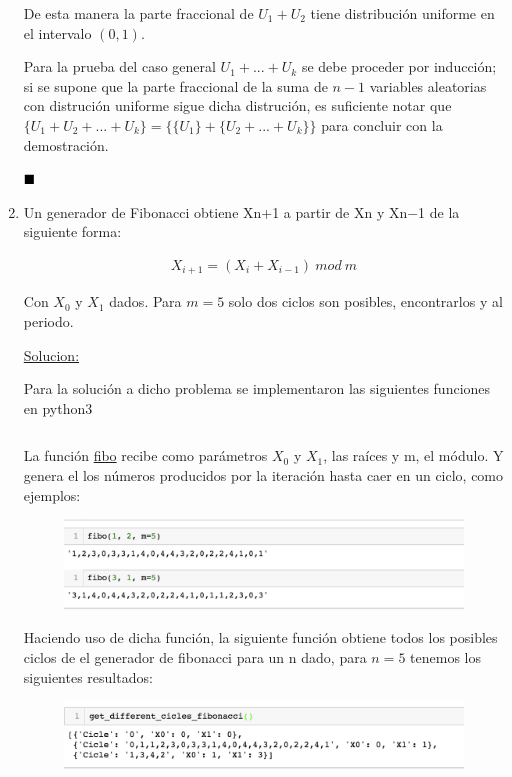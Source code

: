 \documentclass[12 pt]{article}\usepackage[]{graphicx}\usepackage[]{color}
\renewcommand\qedsymbol{$\null\hfill\blacksquare$}
\begin{document}
\begin{enumerate}
    De esta manera la parte fraccional de $U_1 + U_2$ tiene distribución uniforme en el intervalo $(0,1)$. 
    
    Para la prueba del caso general $U_1 + ... + U_k$ se debe proceder por inducción; si se supone que la parte fraccional de la suma de $n-1$ variables aleatorias con distrución uniforme sigue dicha distrución, es suficiente notar que $\{U_1 + U_2 +... + U_k\} =\{\{U_1\} + \{U_2 + ... + U_k\}\}$ para concluir con la demostración.

    \qedsymbol
    
    
    \newpage
    
    \item Un generador de Fibonacci obtiene Xn+1 a partir de Xn y Xn−1 de la siguiente forma:
    
    \begin{align*}
        X_{i+1} = (X_i + X_{i-1}) \ mod \ m
    \end{align*}
    
    Con $X_0$ y $X_1$ dados. Para $m=5$ solo dos ciclos son posibles, encontrarlos y al periodo.
    
    \underline{Solucion:}
    
    Para la solución a dicho problema se implementaron las siguientes funciones en python3
    
    \inputminted[fontsize=\scriptsize]{python}{fibonacci_generator.py}
    
    La función \underline{fibo} recibe como parámetros $X_0$ y $X_1$, las raíces y m, el módulo. Y genera el los números producidos por la iteración hasta caer en un ciclo, como ejemplos:
    
    \begin{figure}[h]
        \centering
        \includegraphics[width=11cm]{fibonacci.png}
    \end{figure}
    
    Haciendo uso de dicha función, la siguiente función obtiene todos los posibles ciclos de el generador de fibonacci para un n dado, para $n=5$ tenemos los siguientes resultados:
    
    \begin{figure}[h]
        \centering
        \includegraphics[width=11cm]{cicles.png}
    \end{figure}
    

\end{enumerate}
\end{document}
